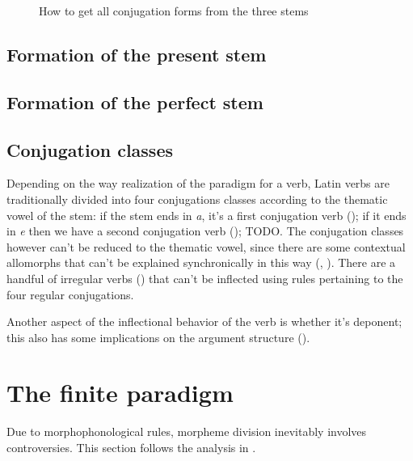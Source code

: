 \documentclass[a4paper, oneside]{report}
\newcommand*{\citechap}[1]{chap.~{#1}}
\newcommand{\form}[1]{\emph{#1}}
\begin{document}
\begin{sidewaysfigure}
    \centering
    
    \caption{How to get all conjugation forms from the three stems}
    \label{fig:stem-to-form}
\end{sidewaysfigure}

\subsection{Formation of the present stem}


\subsection{Formation of the perfect stem}\label{sec:verb-inflection.stem.perfect}

\subsection{Conjugation classes}\label{sec:verb-morphology.stem.conjugation}

Depending on the way realization of the paradigm for a verb,
Latin verbs are traditionally divided into 
four conjugations classes
according to the thematic vowel of the stem:
if the stem ends in \form{a}, 
it's a first conjugation verb ();
if it ends in \form{e} 
then we have a second conjugation verb ();
TODO.
The conjugation classes however can't be reduced to 
the thematic vowel, 
since there are some contextual allomorphs that can't be explained synchronically
in this way
(, ).
There are a handful of irregular verbs ()
that can't be inflected using rules pertaining to the four regular conjugations.

Another aspect of the inflectional behavior of the verb
is whether it's deponent;
this also has some implications on 
the argument structure ().

\section{The finite paradigm}\label{sec:finite-paradigm}

Due to morphophonological rules, 
morpheme division inevitably involves controversies.
This section follows the analysis in \citet[\citechap{14}]{oniga2014latin}.
\end{document}
